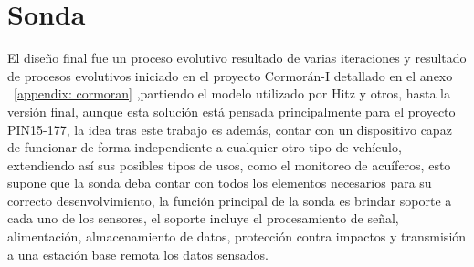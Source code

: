 \section{Sonda}
El dise\~no final fue un proceso evolutivo resultado de varias iteraciones y
resultado de procesos evolutivos iniciado en el proyecto Cormor\'an-I detallado en el anexo ~\ref{appendix: cormoran}
,partiendo el modelo utilizado por Hitz y otros\cite{hitz2012design},
hasta la versi\'on final, aunque esta soluci\'on est\'a pensada principalmente para el proyecto PIN15-177, la idea tras este trabajo es adem\'as, contar con un dispositivo capaz de funcionar de forma independiente a cualquier otro tipo de veh\'iculo, extendiendo as\'i sus posibles tipos de usos, como el monitoreo de acu\'iferos, esto supone que la sonda deba contar con todos los elementos necesarios para su correcto desenvolvimiento, la funci\'on principal de la sonda es brindar soporte a cada uno de los sensores, el soporte incluye el procesamiento de se\~nal, alimentaci\'on, almacenamiento de datos, protecci\'on contra impactos y transmisi\'on a una estaci\'on base remota los datos sensados.

